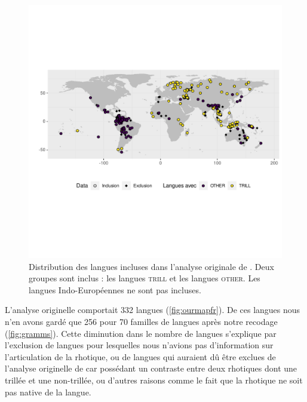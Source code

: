 \begin{figure}
	\centering
	\includegraphics[width=1\linewidth, trim={0 4.75cm 0 4.5cm},clip]{substance/images/our_map_fr}
	\caption[Distribution des langues incluses dans \textcite{winterTrilledAssociatedRoughness2022}]{Distribution des langues incluses dans l'analyse originale de \textcite{winterTrilledAssociatedRoughness2022}. Deux groupes sont inclus : les langues \textsc{trill} et les langues \textsc{other}. Les langues Indo-Européennes ne sont pas incluses.}
	\label{fig:ourmapfr}
\end{figure}

L'analyse originelle comportait 332 langues (\autoref{fig:ourmapfr}). De ces langues nous n'en avons gardé que 256 pour 70 familles de langues après notre recodage (\autoref{fig:gramms}). Cette diminution dans le nombre de langues s'explique par l'exclusion de langues pour lesquelles nous n'avions pas d'information sur l'articulation de la rhotique, ou de langues qui auraient dû être exclues de l'analyse originelle de \textcite{winterTrilledAssociatedRoughness2022} car possédant un contraste entre deux rhotiques dont une trillée et une non-trillée, ou d'autres raisons comme le fait que la rhotique ne soit pas native de la langue.

